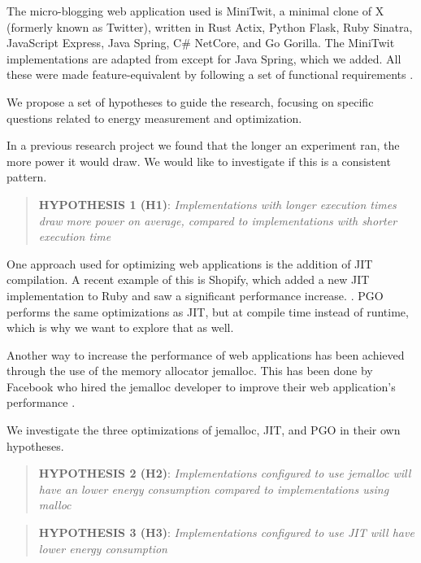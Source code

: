 \documentclass[../main.tex]{subfiles}
\begin{document}
The micro-blogging web application used is MiniTwit, a minimal clone of X (formerly known as Twitter\cite{verge-twitter-rebrand-x}), written in Rust Actix, Python Flask, Ruby Sinatra, JavaScript Express, Java Spring, C\# NetCore, and Go Gorilla. The MiniTwit implementations are adapted from \textcite{Pfeiffer_Trindade_Meding_Harwick} except for Java Spring, which we added. All these were made feature-equivalent by following a set of functional requirements \cite{replication-kit-Karlsen_Landsgaard_Offenberg_Pedersen_2025}.

We propose a set of hypotheses to guide the research, focusing on specific questions related to energy measurement and optimization.

In a previous research project we found that the longer an experiment ran, the more power it would draw. We would like to investigate if this is a consistent pattern.

\begin{quote}
    \textbf{HYPOTHESIS 1 (H1)}: \emph{Implementations with longer execution times draw more power on average, compared to implementations with shorter execution time}
\end{quote}

One approach used for optimizing web applications is the addition of JIT compilation. A recent example of this is Shopify, which added a new JIT implementation to Ruby and saw a significant performance increase. \cite{shopify-yjit}. PGO performs the same optimizations as JIT, but at compile time instead of runtime, which is why we want to explore that as well.

Another way to increase the performance of web applications has been achieved through the use of the memory allocator jemalloc. This has been done by Facebook who hired the jemalloc developer to improve their web application's performance \cite{facebook-jemalloc}. 

We investigate the three optimizations of jemalloc, JIT, and PGO in their own hypotheses.

\begin{quote}
    \textbf{HYPOTHESIS 2 (H2)}: \emph{Implementations configured to use jemalloc will have an lower energy consumption compared to implementations using malloc}
\end{quote}

\begin{quote}
    \textbf{HYPOTHESIS 3 (H3)}: \emph{Implementations configured to use JIT will have lower energy consumption}
\end{quote}
\end{document}
